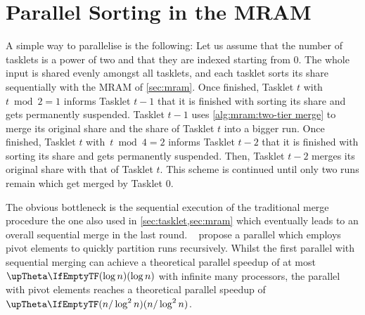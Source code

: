 \chapter{Parallel Sorting in the MRAM}
\label{sec:par}

A simple way to parallelise \MS{} is the following:
Let us assume that the number of tasklets is a power of two and that they are indexed starting from 0.
The whole input is shared evenly amongst all tasklets, and each tasklet sorts its share sequentially with the MRAM \MS{} of \cref{sec:mram}.
Once finished, Tasklet \(t\) with \(t \bmod 2 = 1\) informs Tasklet \(t - 1\) that it is finished with sorting its share and gets permanently suspended.
Tasklet \(t - 1\) uses \cref{alg:mram:two-tier merge} to merge its original share and the share of Tasklet \(t\) into a bigger run.
Once finished, Tasklet \(t\) with~\(t \bmod 4 = 2\) informs Tasklet \(t - 2\) that it is finished with sorting its share and gets permanently suspended.
Then, Tasklet \(t - 2\) merges its original share with that of Tasklet \(t\).
This scheme is continued until only two runs remain which get merged by Tasklet \(0\).

The obvious bottleneck is the sequential execution of the traditional merge procedure \Dash the one also used in \cref{sec:tasklet,sec:mram} \Dash which eventually leads to an overall sequential merge in the last round.
~\cite{cormen2013algorithmen} propose a parallel \MS{} which employs pivot elements to quickly partition runs recursively.
Whilst the first parallel \MS{} with sequential merging can achieve a theoretical parallel speedup of at most \(\bigtheta{\log n}\) with infinite many processors, the parallel \MS{} with pivot elements reaches a theoretical parallel speedup of \(\bigtheta{n / \log^2 n}\).


